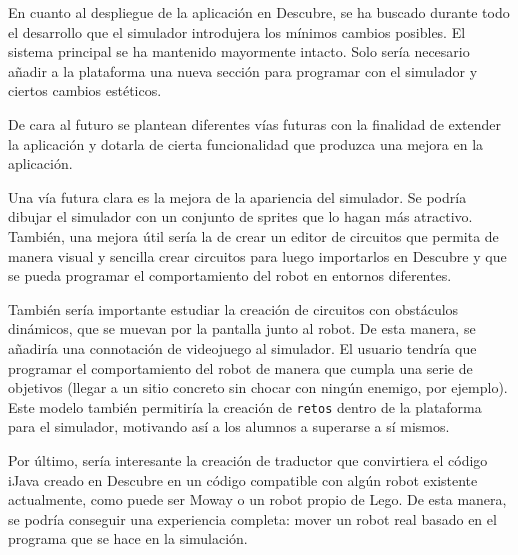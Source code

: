 En cuanto al despliegue de la aplicación en Descubre, se ha buscado durante todo el desarrollo que el simulador introdujera los mínimos cambios posibles. El sistema principal se ha mantenido mayormente intacto. Solo sería necesario añadir a la plataforma una nueva sección para programar con el simulador y ciertos cambios estéticos.



De cara al futuro se plantean diferentes vías futuras con la finalidad de extender la aplicación y dotarla de cierta funcionalidad que produzca una mejora en la aplicación.

Una vía futura clara es la mejora de la apariencia del simulador. Se podría dibujar el simulador con un conjunto de sprites que lo hagan más atractivo. También, una mejora útil sería la de crear un editor de circuitos que permita de manera visual y sencilla crear circuitos para luego importarlos en Descubre y que se pueda programar el comportamiento del robot en entornos diferentes. 

También sería importante estudiar la creación de circuitos con obstáculos dinámicos, que se muevan por la pantalla junto al robot. De esta manera, se añadiría una connotación de videojuego al simulador. El usuario tendría que programar el comportamiento del robot de manera que cumpla una serie de objetivos (llegar a un sitio concreto sin chocar con ningún enemigo, por ejemplo). Este modelo también permitiría la creación de \texttt{retos} dentro de la plataforma para el simulador, motivando así a los alumnos a superarse a sí mismos.

Por último, sería interesante la creación de traductor que convirtiera el código iJava creado en Descubre en un código compatible con algún robot existente actualmente, como puede ser Moway o un robot propio de Lego. De esta manera, se podría conseguir una experiencia completa: mover un robot real basado en el programa que se hace en la simulación.



